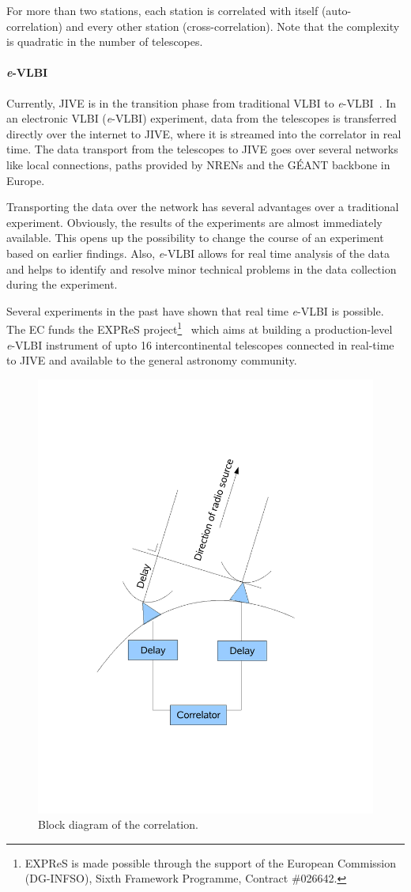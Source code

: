 For more than two stations, each station is correlated with itself
(auto-correlation) and every other station (cross-correlation). Note
that the complexity is quadratic in the number of telescopes. 

\paragraph{{\it e}-VLBI}
Currently, JIVE is in the transition phase from traditional VLBI to
{\it e}-VLBI~\cite{szomoru-2004}. In an electronic VLBI ({\it e}-VLBI)
experiment, data from the telescopes is transferred directly over the
internet to JIVE, where it is streamed into the correlator in real
time. The data transport from the telescopes to JIVE goes over several
networks like local connections, paths provided by NRENs and the
G\'EANT backbone in Europe.

Transporting the data over the network has several advantages over a
traditional experiment. Obviously, the results of the experiments are
almost immediately available. This opens up the possibility to change
the course of an experiment based on earlier findings. Also, {\it
  e}-VLBI allows for real time analysis of the data and helps to
identify and resolve minor technical problems in the data collection
during the experiment.

Several experiments in the past have shown that real time {\it e}-VLBI
is possible. The EC funds the EXPReS project\footnote{EXPReS is made
  possible through the support of the European Commission (DG-INFSO),
  Sixth Framework Programme, Contract \#026642.}~\cite{EXPReS} which
aims at building a production-level {\it e}-VLBI instrument of upto 16
intercontinental telescopes connected in real-time to JIVE and
available to the general astronomy community.

\begin{figure}
  \centering
  \includegraphics[width=.75\textwidth]
  {img/VLBI}
  \caption{Block diagram of the correlation.}
  \label{fig:correlation_diagram}
\end{figure}



